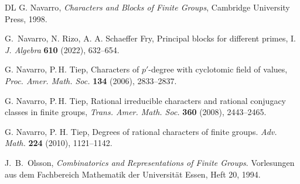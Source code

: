 \documentclass[a4paper,12pt,leqno]{amsart}
\newcommand{\6}{^}
\theoremstyle{definition}
\theoremstyle{definition}
\theoremstyle{definition}
\theoremstyle{definition}
\theoremstyle{definition}
\begin{document}
\begin{thebibliography}{DL}
{\sc G. Navarro}, {\em Characters and Blocks of Finite Groups}, Cambridge University Press, 1998.

{\sc G.~Navarro, N. Rizo, A. A. Schaeffer Fry},
 Principal blocks for different primes, I. {\em J. Algebra}
{\bf 610} (2022), 632--654.
 

{\sc G. Navarro, P.\,H. Tiep}, Characters of $p'$-degree with
cyclotomic field of values,
\emph{Proc. Amer. Math. Soc.}
\textbf{134} (2006), 2833--2837.

 {\sc G. Navarro, P.\,H. Tiep}, Rational irreducible
 characters and rational conjugacy classes in finite groups,
 \emph{Trans. Amer. Math. Soc.}
 \textbf{360} (2008), 2443--2465.

 {\sc G. Navarro, P. H. Tiep}, Degrees of rational characters of finite groups. \emph{Adv. Math.} {\bf 224} (2010), 1121--1142.
  
{\sc J.~B.~Olsson}, \emph{Combinatorics and Representations of Finite Groups}.
  Vorlesungen aus dem Fachbereich Mathematik der Universit\"at Essen, Heft 20,
  1994.
  


\end{thebibliography}
\end{document}
